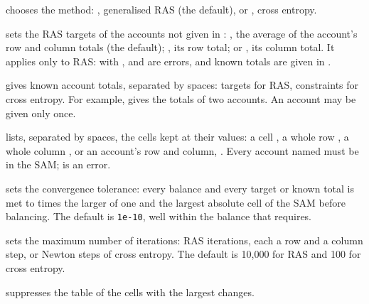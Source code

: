 
\begin{optdesc}
\item[\optarg{meth}{od}{method}] chooses the method: , generalised
RAS (the default), or , cross entropy.

\item[\optarg{targ}{ets}{rule}] sets the RAS targets of the accounts not given
in : , the average of the account's row and column
totals (the default); , its row total; or , its column
total. It applies only to RAS: with ,  and
 are errors, and known totals are given in .

\item[\optarg{tot}{als}{\argu{account}\texttt{:}\argu{value} \dots}] gives
known account totals, separated by spaces: targets for RAS, constraints for
cross entropy. For example,  gives the totals
of two accounts. An account may be given only once.

\item[\optarg{fix}{ed}{list}] lists, separated by spaces, the cells kept at
their values: a cell \cmd{:}, a whole row
\cmd{:*}, a whole column \cmd{*:}, or an account's row and
column, . Every account named must be in the SAM; \cmd{*:*} is an
error.

\item[\optarg{tol}{erance}{\#}] sets the convergence tolerance: every balance
and every target or known total is met to \argu{\#} times the larger of one
and the largest absolute cell of the SAM before balancing. The default is
\texttt{1e-10}, well within the balance that  requires.

\item[\optarg{iter}{ate}{\#}] sets the maximum number of iterations: RAS
iterations, each a row and a column step, or Newton steps of cross entropy. The
default is 10,000 for RAS and 100 for cross entropy.

\item[\opt{nod}{isplay}] suppresses the table of the cells with the largest
changes.
\end{optdesc}


